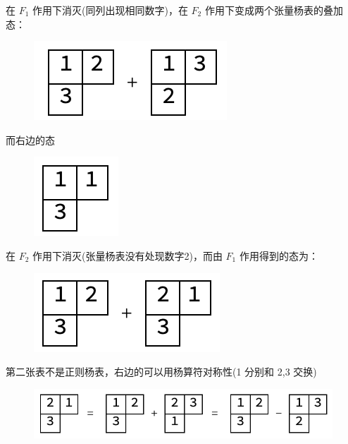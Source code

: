 \documentclass[UTF8]{ctexart}
\begin{document}
\noindent 在 $F_1$ 作用下消灭(同列出现相同数字)，在 $F_2$ 作用下变成两个张量杨表的叠加态：

\begin{figure}[H]
\begin{centering}
\includegraphics[width=0.25\linewidth]{include/Y5}
\par\end{centering}
\end{figure}

\noindent 而右边的态

\begin{figure}[H]
\begin{centering}
\includegraphics[width=0.1\linewidth]{include/Y6}
\par\end{centering}
\end{figure}

\noindent 在 $F_2$ 作用下消灭(张量杨表没有处现数字2)，而由 $F_1$ 作用得到的态为：

\begin{figure}[H]
\begin{centering}
\includegraphics[width=0.25\linewidth]{include/Y7}
\par\end{centering}
\end{figure}

\noindent 第二张表不是正则杨表，右边的可以用杨算符对称性(1 分别和 2,3 交换)

\begin{figure}[H]
\begin{centering}
\includegraphics[width=0.6\linewidth]{include/Y8}
\par\end{centering}
\end{figure}
\end{document}
